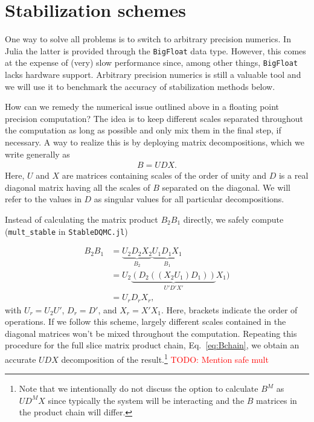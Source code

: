 \documentclass[%
 reprint,
superscriptaddress,
citeautoscript,
showpacs,
 amsmath,amssymb,
 aps,
 prb,
longbibliography,
]{revtex4-1}
\begin{document}
\section{\label{sec:stabilization}Stabilization schemes}

One way to solve all problems is to switch to arbitrary precision numerics. In Julia the latter is provided through the \texttt{BigFloat} data type. However, this comes at the expense of (very) slow performance since, among other things, \texttt{BigFloat} lacks hardware support. Arbitrary precision numerics is still a valuable tool and we will use it to benchmark the accuracy of stabilization methods below.

How can we remedy the numerical issue outlined above in a floating point precision computation? The idea is to keep different scales separated throughout the computation as long as possible and only mix them in the final step, if necessary. A way to realize this is by deploying matrix decompositions, which we write generally as
\begin{align}
	B = UDX.
\end{align}
Here, $U$ and $X$ are matrices containing scales of the order of unity and $D$ is a real diagonal matrix having all the scales of $B$ separated on the diagonal. We will refer to the values in $D$ as singular values for all particular decompositions.

Instead of calculating the matrix product $B_2 B_1$ directly, we safely compute (\texttt{mult\_stable} in \texttt{StableDQMC.jl})

\begin{align}
B_2 B_1 &= \underbrace{U_2 D_2 X_2}_{B_2}\underbrace{U_1 D_1 X_1}_{B_1} \nonumber\\
&= U_2 \underbrace{(D_2 ((X_2 U_1) D_1))}_{U' D' X'} X_1)\\
&= U_r D_r X_r, \nonumber
\end{align}
with $U_r = U_2 U'$, $D_r = D'$, and $X_r = X' X_1$. Here, brackets indicate the order of operations. If we follow this scheme, largely different scales contained in the diagonal matrices won't be mixed throughout the computation. Repeating this procedure for the full slice matrix product chain, Eq.~\eqref{eq:Bchain}, we obtain an accurate $UDX$ decomposition of the result.\footnote{Note that we intentionally do not discuss the option to calculate $B^M$ as $U D^M X$ since typically the system will be interacting and the $B$ matrices in the product chain will differ.} \textcolor{red}{TODO: Mention safe mult}
\end{document}
